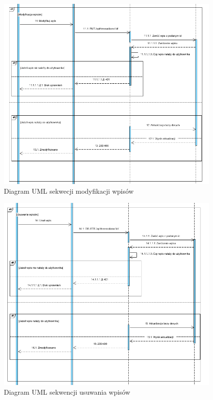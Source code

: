 \documentclass{article}
\begin{document}
	\begin{figure}[H]
		
		\hspace*{-3cm} 
		\includegraphics[scale=0.9]{assets/umlSEQ5.png}
		\caption[]{Diagram UML sekwecji modyfikacji wpisów}
		\label{fig:umlmod}
	\end{figure}  
	\begin{figure}[H]
		
		\hspace*{-3cm} 
		\includegraphics[scale=0.9]{assets/umlSEQ6.png}
		\caption[]{Diagram UML sekwencji usuwania wpisów}
		\label{fig:umlusu}
	\end{figure} 
\end{document}
